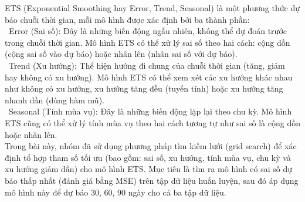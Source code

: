 ETS (Exponential Smoothing hay Error, Trend, Seasonal) là một phương thức dự báo chuỗi thời gian, mỗi mô hình được xác định bởi ba thành phần:\\
\indent\textbullet\ Error (Sai số): Đây là những biến động ngẫu nhiên, không thể dự đoán trước trong chuỗi thời gian. Mô hình ETS có thể xử lý sai số theo hai cách: cộng dồn (cộng sai số vào dự báo) hoặc nhân lên (nhân sai số với dự báo).\\
\indent\textbullet\ Trend (Xu hướng): Thể hiện hướng đi chung của chuỗi thời gian (tăng, giảm hay không có xu hướng). Mô hình ETS có thể xem xét các xu hướng khác nhau như không có xu hướng, xu hướng tăng đều (tuyến tính) hoặc xu hướng tăng nhanh dần (dùng hàm mũ).\\
\indent\textbullet\ Seasonal (Tính mùa vụ): Đây là những biến động lặp lại theo chu kỳ. Mô hình ETS cũng có thể xử lý tính mùa vụ theo hai cách tương tự như sai số là cộng dồn hoặc nhân lên. \\
Trong bài này, nhóm đã sử dụng phương pháp tìm kiếm lưới (grid search) để xác định tổ hợp tham số tối ưu (bao gồm: sai số, xu hướng, tính mùa vụ, chu kỳ và xu hướng giảm dần) cho mô hình ETS. Mục tiêu là tìm ra mô hình có sai số dự báo thấp nhất (đánh giá bằng MSE) trên tập dữ liệu huấn luyện, sau đó áp dụng mô hình này để dự báo 30, 60, 90 ngày cho cả ba tập dữ liệu.
